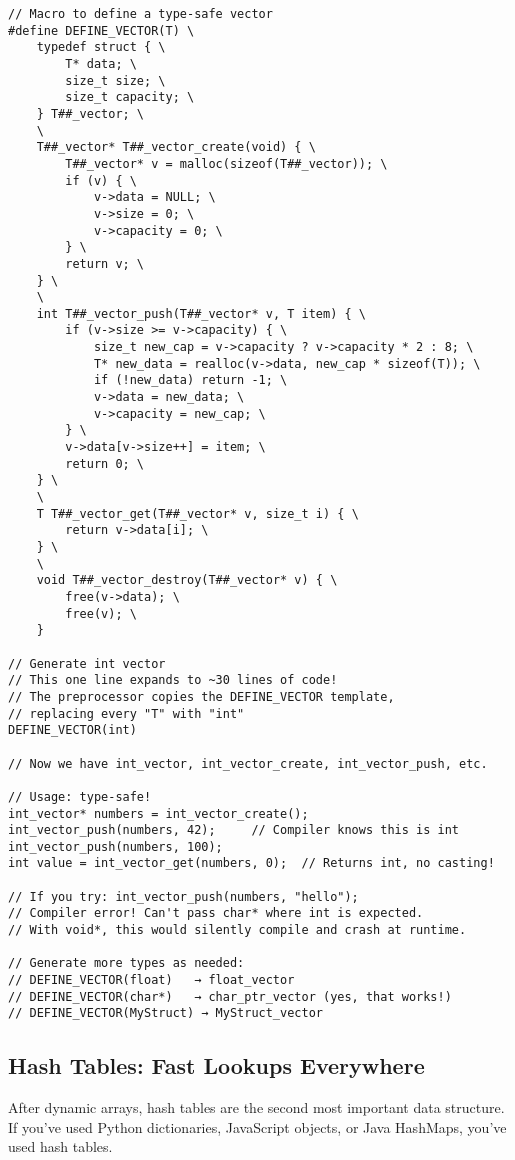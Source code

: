 \begin{lstlisting}
// Macro to define a type-safe vector
#define DEFINE_VECTOR(T) \
    typedef struct { \
        T* data; \
        size_t size; \
        size_t capacity; \
    } T##_vector; \
    \
    T##_vector* T##_vector_create(void) { \
        T##_vector* v = malloc(sizeof(T##_vector)); \
        if (v) { \
            v->data = NULL; \
            v->size = 0; \
            v->capacity = 0; \
        } \
        return v; \
    } \
    \
    int T##_vector_push(T##_vector* v, T item) { \
        if (v->size >= v->capacity) { \
            size_t new_cap = v->capacity ? v->capacity * 2 : 8; \
            T* new_data = realloc(v->data, new_cap * sizeof(T)); \
            if (!new_data) return -1; \
            v->data = new_data; \
            v->capacity = new_cap; \
        } \
        v->data[v->size++] = item; \
        return 0; \
    } \
    \
    T T##_vector_get(T##_vector* v, size_t i) { \
        return v->data[i]; \
    } \
    \
    void T##_vector_destroy(T##_vector* v) { \
        free(v->data); \
        free(v); \
    }

// Generate int vector
// This one line expands to ~30 lines of code!
// The preprocessor copies the DEFINE_VECTOR template,
// replacing every "T" with "int"
DEFINE_VECTOR(int)

// Now we have int_vector, int_vector_create, int_vector_push, etc.

// Usage: type-safe!
int_vector* numbers = int_vector_create();
int_vector_push(numbers, 42);     // Compiler knows this is int
int_vector_push(numbers, 100);
int value = int_vector_get(numbers, 0);  // Returns int, no casting!

// If you try: int_vector_push(numbers, "hello");
// Compiler error! Can't pass char* where int is expected.
// With void*, this would silently compile and crash at runtime.

// Generate more types as needed:
// DEFINE_VECTOR(float)   → float_vector
// DEFINE_VECTOR(char*)   → char_ptr_vector (yes, that works!)
// DEFINE_VECTOR(MyStruct) → MyStruct_vector
\end{lstlisting}

\subsection{Hash Tables: Fast Lookups Everywhere}

After dynamic arrays, hash tables are the second most important data structure. If you've used Python dictionaries, JavaScript objects, or Java HashMaps, you've used hash tables.

